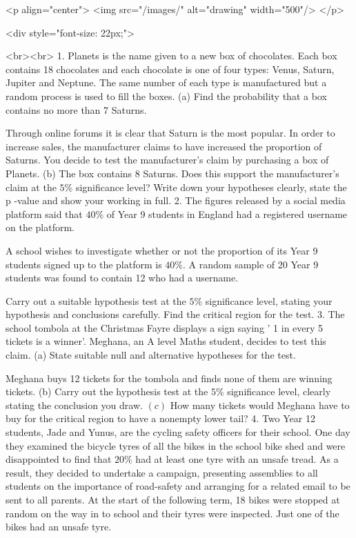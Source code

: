 <p align="center">
<img src="/images/" alt="drawing" width="500"/>
</p>

<div style="font-size: 22px;">

<br><br>
1. Planets is the name given to a new box of chocolates. Each box contains 18 chocolates and each chocolate is one of four types: Venus, Saturn, Jupiter and Neptune. The same number of each type is manufactured but a random process is used to fill the boxes.
(a) Find the probability that a box contains no more than 7 Saturns.

Through online forums it is clear that Saturn is the most popular. In order to increase sales, the manufacturer claims to have increased the proportion of Saturns. You decide to test the manufacturer's claim by purchasing a box of Planets.
(b) The box contains 8 Saturns. Does this support the manufacturer's claim at the $5 \%$ significance level? Write down your hypotheses clearly, state the p -value and show your working in full.
2. The figures released by a social media platform said that $40 \%$ of Year 9 students in England had a registered username on the platform.

A school wishes to investigate whether or not the proportion of its Year 9 students signed up to the platform is $40 \%$. A random sample of 20 Year 9 students was found to contain 12 who had a username.

Carry out a suitable hypothesis test at the $5 \%$ significance level, stating your hypothesis and conclusions carefully. Find the critical region for the test.
3. The school tombola at the Christmas Fayre displays a sign saying ' 1 in every 5 tickets is a winner'. Meghana, an A level Maths student, decides to test this claim.
(a) State suitable null and alternative hypotheses for the test.

Meghana buys 12 tickets for the tombola and finds none of them are winning tickets.
(b) Carry out the hypothesis test at the $5 \%$ significance level, clearly stating the conclusion you draw.
\((c)\) How many tickets would Meghana have to buy for the critical region to have a nonempty lower tail?
4. Two Year 12 students, Jade and Yunus, are the cycling safety officers for their school. One day they examined the bicycle tyres of all the bikes in the school bike shed and were disappointed to find that $20 \%$ had at least one tyre with an unsafe tread. As a result, they decided to undertake a campaign, presenting assemblies to all students on the importance of road-safety and arranging for a related email to be sent to all parents. At the start of the following term, 18 bikes were stopped at random on the way in to school and their tyres were inspected. Just one of the bikes had an unsafe tyre.

